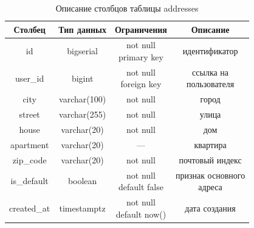 \begin{table}[H]
    \caption{Описание столбцов таблицы addresses}
    \label{tbl:t_addresses}
    \rpzcompacttable
    \begin{tabular}[]{|c|c|c|c|}
        \hline
        \textbf{Столбец} & \textbf{Тип данных} & \textbf{Ограничения} & \textbf{Описание} \\ \hline
        id & bigserial & \makecell{not null \\ primary key} & идентификатор \\ \hline
        user\_id & bigint & \makecell{not null \\ foreign key} & \makecell{ссылка на\\пользователя} \\ \hline
        city & varchar(100) & not null & город \\ \hline
        street & varchar(255) & not null & улица \\ \hline
        house & varchar(20) & not null & дом \\ \hline
        apartment & varchar(20) & --- & квартира \\ \hline
        zip\_code & varchar(20) & not null & почтовый индекс \\ \hline
        is\_default & boolean & \makecell{not null \\ default false} & \makecell{признак основного\\адреса} \\ \hline
        created\_at & timestamptz & \makecell{not null \\ default now()} & дата создания \\ \hline
    \end{tabular}
\end{table}

